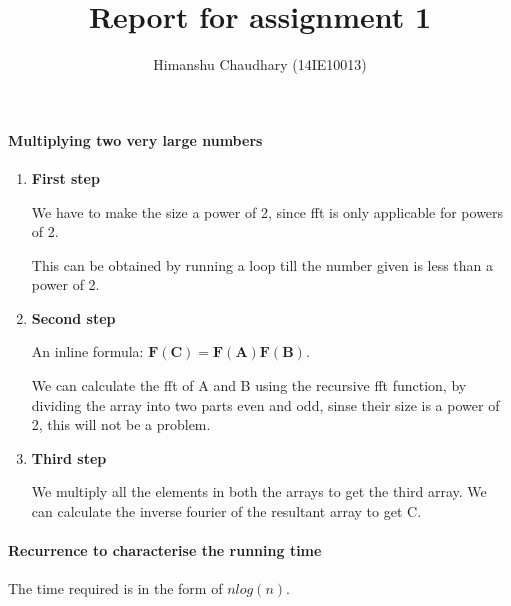 \documentclass[a4paper,11pt]{article}
\title{Report for assignment 1}
\author{Himanshu Chaudhary (14IE10013)}
\begin{document}
\maketitle

\paragraph{Multiplying two very large numbers}
\begin{enumerate}
 \item \textbf{First step}

We have to make the size a power of 2, since fft is only applicable for powers of 2.

This can be obtained by running a loop till the number given is less than a power of 2.

 \item \textbf{Second step}

An inline formula: $\mathbf{F(C)} = \mathbf{F(A)} \mathbf{F(B)}$.

We can calculate the fft of A and B using the recursive fft function, by dividing the array into two parts even and odd, sinse their size is a power of 2, this will not be a problem.

 \item \textbf{Third step}
 
 We multiply all the elements in both the arrays to get the third array.
 We can calculate the inverse fourier of the resultant array to get C.

\end{enumerate}


\paragraph{Recurrence to characterise the running time}

The time required is in the form of
 $nlog(n)$.
\end{document}
